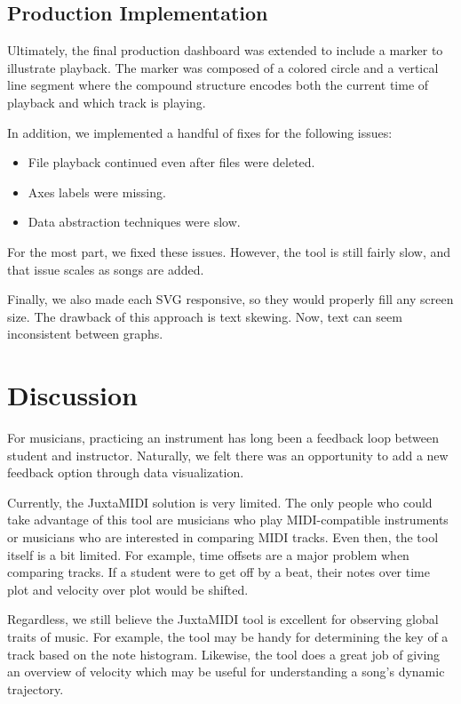 \documentclass[journal]{vgtc}                %
\begin{document}
\subsection{Production Implementation}

Ultimately, the final production dashboard was extended to include a marker
to illustrate playback. The marker was composed of a colored circle and a vertical
line segment where the compound structure encodes both the current time of
playback and which track is playing.

In addition, we implemented a handful of fixes for the following issues:

\begin{itemize}
  \item File playback continued even after files were deleted.
  \item Axes labels were missing.
  \item Data abstraction techniques were slow.
\end{itemize}

For the most part, we fixed these issues. However, the tool is still fairly
slow, and that issue scales as songs are added.

Finally, we also made each SVG responsive, so they would properly fill
any screen size. The drawback of this approach is text skewing. Now, text can
seem inconsistent between graphs.

\section{Discussion}

For musicians, practicing an instrument has long been a feedback loop between
student and instructor. Naturally, we felt there was an opportunity to add
a new feedback option through data visualization.

Currently, the JuxtaMIDI solution is very limited. The only people who
could take advantage of this tool are musicians who play MIDI-compatible
instruments or musicians who are interested in comparing MIDI tracks.
Even then, the tool itself is a bit limited. For example, time offsets
are a major problem when comparing tracks. If a student were to get off by
a beat, their notes over time plot and velocity over plot would be shifted.

Regardless, we still believe the JuxtaMIDI tool is excellent for observing
global traits of music. For example, the tool may be handy for determining
the key of a track based on the note histogram. Likewise, the tool does a
great job of giving an overview of velocity which may be useful for understanding
a song's dynamic trajectory.
\end{document}
